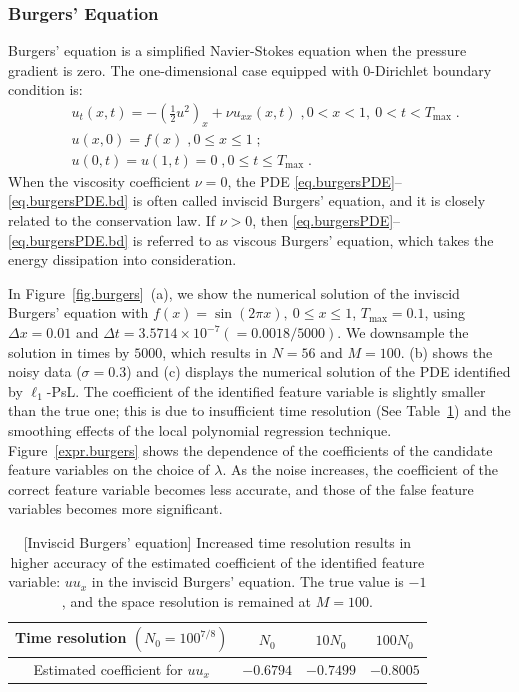 \documentclass[a4paper,11pt]{article}
\begin{document}
\subsubsection{Burgers' Equation}
Burgers' equation is a simplified Navier-Stokes equation when the pressure gradient is zero. The one-dimensional case equipped with 0-Dirichlet boundary condition is: 
\begin{align}
&u_t(x,t) = -(\frac{1}{2}u^2)_x+\nu u_{xx}(x,t)\;,0<x<1,~0<t<T_{\max}\;.\label{eq.burgersPDE}\\
&u(x,0)=f(x)\;, 0\leq x\leq 1\;;\label{eq.burgersPDE.ival}\\
&u(0,t)=u(1,t)=0\;,0\leq t\leq T_{\max}\label{eq.burgersPDE.bd}\;.
\end{align}
When the viscosity coefficient $\nu=0$, the PDE \eqref{eq.burgersPDE}--\eqref{eq.burgersPDE.bd} is often called inviscid Burgers' equation, and it is closely related to the conservation law. If $\nu>0$, then \eqref{eq.burgersPDE}--\eqref{eq.burgersPDE.bd} is referred to as viscous Burgers' equation, which takes the energy dissipation into consideration.

In Figure~\ref{fig.burgers}~(a), we show the numerical solution of the inviscid Burgers' equation with $f(x)=\sin(2\pi x),~0\leq x\leq 1$, $T_{\max}=0.1$, using $\Delta x = 0.01$ and $\Delta t=3.5714\times 10^{-7} (=0.0018/5000)$. We  downsample the solution in times by $5000$, which results in $N=56$ and $M=100$. (b) shows the noisy data ($\sigma=0.3$) and  (c) displays the numerical solution of the PDE identified by $\ell_1$-PsL. The coefficient of the identified feature variable is slightly smaller than the true one; this is due to insufficient time resolution (See Table~\ref{tab.coeff.burgers}) and the smoothing effects of the local polynomial regression technique. Figure~\ref{expr.burgers} shows the dependence of the coefficients of the candidate feature variables on the choice of $\lambda$. As the noise increases, the coefficient of the correct feature variable becomes less accurate, and those of the false feature variables becomes more significant.
\begin{table}
\centering
\begin{tabular}{c|c|c|c}
Time resolution $(N_0=100^{7/8})$&$N_0$&$10N_0$&$100N_0$\\\hline
Estimated coefficient for $uu_x$&$-0.6794$&$-0.7499$&$-0.8005$
\end{tabular}	
\caption{[Inviscid Burgers' equation] Increased time resolution results in higher accuracy of the estimated coefficient of the identified feature variable: $uu_x$ in the inviscid Burgers' equation. The true value is $-1$, and the space resolution is remained at $M=100$.}\label{tab.coeff.burgers}
\end{table}
\end{document}
